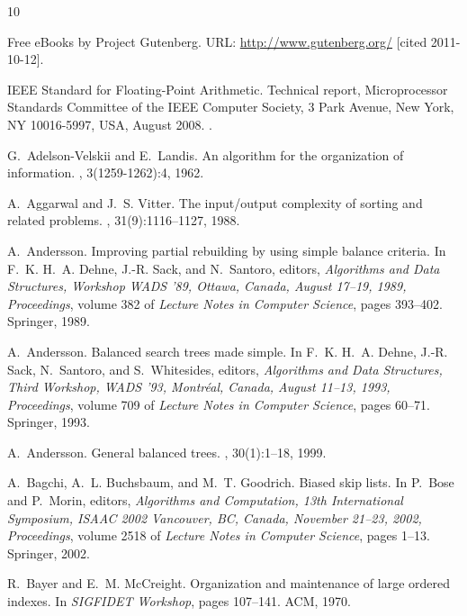 \documentclass[10pt]{book}
\theoremstyle{plain}
\theoremstyle{definition}
\begin{document}
\cleardoublepage
{}

\begin{thebibliography}{10}

Free e{B}ooks by {P}roject {G}utenberg.
\newblock URL: \url{http://www.gutenberg.org/} [cited 2011-10-12].

{IEEE Standard for Floating-Point Arithmetic}.
\newblock Technical report, Microprocessor Standards Committee of the IEEE
  Computer Society, 3 Park Avenue, New York, NY 10016-5997, USA, August 2008.
\newblock \href {https://doi.org/10.1109/IEEESTD.2008.4610935}
  {}.

G.~Adelson-Velskii and E.~Landis.
\newblock An algorithm for the organization of information.
, 3(1259-1262):4, 1962.

A.~Aggarwal and J.~S. Vitter.
\newblock The input/output complexity of sorting and related problems.
, 31(9):1116--1127, 1988.

A.~Andersson.
\newblock Improving partial rebuilding by using simple balance criteria.
\newblock In F.~K. H.~A. Dehne, J.-R. Sack, and N.~Santoro, editors, {\em
  Algorithms and Data Structures, Workshop WADS '89, Ottawa, Canada, August
  17--19, 1989, Proceedings}, volume 382 of {\em Lecture Notes in Computer
  Science}, pages 393--402. Springer, 1989.

A.~Andersson.
\newblock Balanced search trees made simple.
\newblock In F.~K. H.~A. Dehne, J.-R. Sack, N.~Santoro, and S.~Whitesides,
  editors, {\em Algorithms and Data Structures, Third Workshop, WADS '93,
  Montr{\'e}al, Canada, August 11--13, 1993, Proceedings}, volume 709 of {\em
  Lecture Notes in Computer Science}, pages 60--71. Springer, 1993.

A.~Andersson.
\newblock General balanced trees.
, 30(1):1--18, 1999.

A.~Bagchi, A.~L. Buchsbaum, and M.~T. Goodrich.
\newblock Biased skip lists.
\newblock In P.~Bose and P.~Morin, editors, {\em Algorithms and Computation,
  13th International Symposium, ISAAC 2002 Vancouver, BC, Canada, November
  21--23, 2002, Proceedings}, volume 2518 of {\em Lecture Notes in Computer
  Science}, pages 1--13. Springer, 2002.

R.~Bayer and E.~M. McCreight.
\newblock Organization and maintenance of large ordered indexes.
\newblock In {\em SIGFIDET Workshop}, pages 107--141. ACM, 1970.


\end{thebibliography}
\end{document}
